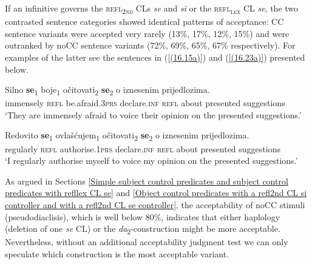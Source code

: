 If an infinitive governs the \textsc{refl\textsubscript{2nd}} CLs \textit{se} and \textit{si} or the \textsc{refl\textsubscript{\textsc{lex}}} CL \textit{se}, the two contrasted sentence categories showed identical patterns of acceptance: CC sentence variants were accepted very rarely (13\%, 17\%, 12\%, 15\%) and were outranked by noCC sentence variants (72\%, 69\%, 65\%, 67\% respectively). For examples of the latter see the sentences in (\ref{(16.15a)}) and (\ref{(16.23a)}) presented below. 

\begin{exe}
\gll Silno \textbf{se}\textsubscript{1} boje\textsubscript{1} očitovati\textsubscript{2} \textbf{se}\textsubscript{2} o iznesenim prijedlozima.\\
 immensely \textsc{refl} be.afraid.3\textsc{prs} declare.\textsc{inf} \textsc{refl} about presented suggestions\\
\glt ‘They are immensely afraid to voice their opinion on the presented suggestions.’

\ex\label{(16.23a)}
\gll Redovito \textbf{se}\textsubscript{1} ovlašćujem\textsubscript{1} očitovati\textsubscript{2} \textbf{se}\textsubscript{2} o iznesenim prijedlozima.\\
 regularly \textsc{refl} authorise.1\textsc{prs} declare.\textsc{inf} \textsc{refl} about presented suggestions\\
\glt ‘I regularly authorise myself to voice my opinion on the presented suggestions.’
\end{exe}

\noindent As argued in Sections \ref{Simple subject control predicates and subject control predicates with refllex CL se} and \ref{Object control predicates with a refl2nd CL si controller and with a refl2nd CL se controller}, the acceptability of noCC stimuli (pseudodiaclisis), which is well below 80\%, indicates that either haplology (deletion of one \textit{se} CL) or the \textit{da}\textsubscript{2}-construction might be more acceptable. Nevertheless, without an additional acceptability judgment test we can only speculate which construction is the most acceptable variant. 

